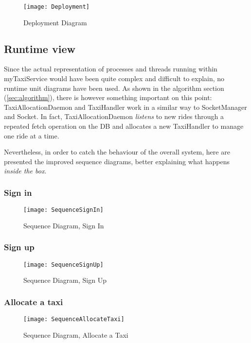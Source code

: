 \begin{figure}[h!]
    \centering
    \texttt{[image: Deployment]}
    \caption{Deployment Diagram}
    \label{fig:deploy}
\end{figure}

\pagebreak

\subsection{Runtime view}
Since the actual representation of processes and threads running within myTaxiService would have been quite complex and difficult to explain, no runtime unit diagrams have been used. As shown in the algorithm section (\ref{sec:algorithm}), there is however something important on this point: TaxiAllocationDaemon and TaxiHandler work in a similar way to SocketManager and Socket. In fact, TaxiAllocationDaemon \emph{listens} to new rides through a repeated fetch operation on the DB and allocates a new TaxiHandler to manage one ride at a time.

Nevertheless, in order to catch the behaviour of the overall system, here are presented the improved sequence diagrams, better explaining what happens \emph{inside the box}.

\subsubsection{Sign in} %
\begin{figure}[H]
    \centering
    \texttt{[image: SequenceSignIn]}
    \caption{Sequence Diagram, Sign In}
    \label{fig:signin}
\end{figure}

\subsubsection{Sign up} %
\begin{figure}[H]
    \centering
    \texttt{[image: SequenceSignUp]}
    \caption{Sequence Diagram, Sign Up}
    \label{fig:signup}
\end{figure}

\subsubsection{Allocate a taxi} %
\begin{figure}[H]
    \centering
    \texttt{[image: SequenceAllocateTaxi]}
    \caption{Sequence Diagram, Allocate a Taxi}
    \label{fig:allocate}
\end{figure}

